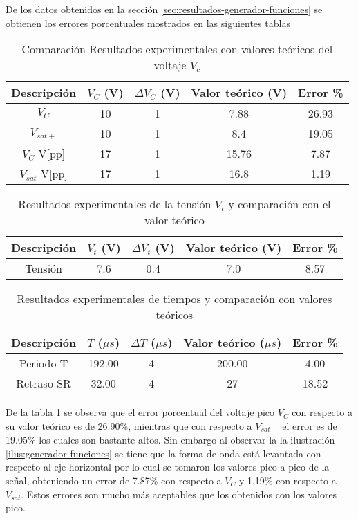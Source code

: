 De los datos obtenidos en la sección \ref{sec:resultados-generador-funciones} se obtienen los errores porcentuales mostrados en las siguientes tablas

\begin{table}[ht]
\centering
\begin{tabular}{|c|c|c|c|c|}
\hline
Descripción & $V_C$ (V) & $\Delta V_C$ (V) & Valor teórico (V) & Error \% \\ \hline
$V_C$ & 10 & 1 & 7.88 & 26.93 \\ \hline
$V_{sat+}$ & 10 & 1 & 8.4 & 19.05 \\ \hline
$V_C$ V[pp] & 17 & 1 & 15.76 & 7.87 \\ \hline
$V_{sat}$ V[pp] & 17 & 1 & 16.8 & 1.19 \\ \hline
\end{tabular}
\caption{Comparación Resultados experimentales con valores teóricos del voltaje $V_c$ }
\label{tab:comparacion-voltaje-Vc}
\end{table}

\begin{table}[ht]
\centering
\begin{tabular}{|c|c|c|c|c|}
\hline
Descripción & $V_t$ (V) & $\Delta V_t$ (V) & Valor teórico (V) & Error \% \\ \hline
Tensión & 7.6 & 0.4 & 7.0 & 8.57 \\ \hline
\end{tabular}
\caption{Resultados experimentales de la tensión $V_t$ y comparación con el valor teórico}
\label{tab:comparacion-voltaje-Vt}
\end{table}

\begin{table}[ht]
\centering
\begin{tabular}{|c|c|c|c|c|}
\hline
Descripción & $T$ ($\mu s$) & $\Delta T$ ($\mu s$) & Valor teórico ($\mu s$) & Error \% \\ \hline
Periodo T & 192.00 & 4 & 200.00 & 4.00 \\ \hline
Retraso SR & 32.00 & 4 & 27 & 18.52 \\ \hline
\end{tabular}
\caption{Resultados experimentales de tiempos y comparación con valores teóricos}
\label{tab:comparacion-tiempo-generador}
\end{table}

De la tabla \ref{tab:comparacion-voltaje-Vc} se observa que el error porcentual del voltaje pico $V_C$ con respecto a su valor teórico es de 26.90\%, mientras que con respecto a $V_{sat+}$ el error es de 19.05\% los cuales son bastante altos. Sin embargo al observar la la ilustración \ref{ilus:generador-funciones} se tiene que la forma de onda está levantada con respecto al eje horizontal por lo cual se tomaron los valores pico a pico de la señal, obteniendo un error de 7.87\% con respecto a $V_C$ y 1.19\% con respecto a $V_{sat}$. Estos errores son mucho más aceptables que los obtenidos con los valores pico.

